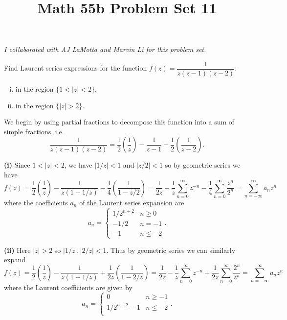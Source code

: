 \documentclass[11pt,letterpaper]{article}
\title{\textbf{Math 55b Problem Set 11}}
\begin{document}
\maketitle

\begin{center}
    \textit{I collaborated with AJ LaMotta and Marvin Li for this problem set.}
\end{center}

\begin{problem}
    Find Laurent series expressions for the function
$f(z)=\dfrac{1}{z(z-1)(z-2)}$:
\begin{enumerate}[(i)]
    \item in the region $\{1<|z|<2\}$, 
    \item in the region $\{|z|>2\}$.
\end{enumerate}
\end{problem}

\begin{solution}
    We begin by using partial fractions to decompose this function into a sum of simple fractions, i.e.
    \[
        \frac{1}{z(z-1)(z-2)} = \frac12\left(\frac{1}{z}\right)-\frac{1}{z-1}+\frac12\left(\frac{1}{z-2}\right).
    \]

    \textbf{(i)} Since $1<|z|<2$, we have $|1/z|<1$ and $|z/2|<1$ so by geometric series we have
    \[
        f(z)=\frac12\left(\frac{1}{z}\right)-\frac{1}{z(1-1/z)}-\frac14\left(\frac{1}{1-z/2}\right)=\frac{1}{2z}-\frac{1}{z}\sum^\infty_{n=0} z^{-n} - \frac14\sum^\infty_{n=0} \frac{z^n}{2^n}=\sum^\infty_{n=-\infty} a_n z^n
    \] 
    where the coefficients $a_n$ of the Laurent series expansion are
    \[
        a_n=\begin{cases}
            1/2^{n+2}&n\geq 0\\
            -1/2&n=-1\\
            -1&n\leq -2
        \end{cases}
    .\]
    
    \textbf{(ii)} Here $|z|>2$ so $|1/z|, |2/z| < 1$. Thus by geometric series we can similarly expand
    \[
        f(z)=\frac12\left(\frac{1}{z}\right)-\frac{1}{z(1-1/z)}+\frac{1}{2z}\left(\frac{1}{1-2/z}\right)=\frac{1}{2z}-\frac{1}{z}\sum^\infty_{n=0}z^{-n}+\frac{1}{2z}\sum^\infty_{n=0}\frac{2^n}{z^n} = \sum^\infty_{n=-\infty} a_n z^n    
    \]
    where the Laurent coefficients are given by
    \[
        a_n=\begin{cases}
            0 & n\geq -1\\
            1/2^{n+2}-1 & n\leq -2\\
        \end{cases}
    .\] 
\end{solution}
\end{document}
